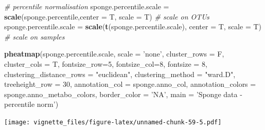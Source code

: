 \documentclass[]{book}
\newenvironment{Shaded}{\begin{snugshade}}{\end{snugshade}}
\newcommand{\KeywordTok}[1]{\textcolor[rgb]{0.13,0.29,0.53}{\textbf{#1}}}
\newcommand{\DataTypeTok}[1]{\textcolor[rgb]{0.13,0.29,0.53}{#1}}
\newcommand{\DecValTok}[1]{\textcolor[rgb]{0.00,0.00,0.81}{#1}}
\newcommand{\StringTok}[1]{\textcolor[rgb]{0.31,0.60,0.02}{#1}}
\newcommand{\CommentTok}[1]{\textcolor[rgb]{0.56,0.35,0.01}{\textit{#1}}}
\newcommand{\NormalTok}[1]{#1}
\begin{document}
\begin{Shaded}
\begin{Highlighting}[]
\CommentTok{# percentile normalisation}
\NormalTok{sponge.percentile.scale =}\StringTok{ }\KeywordTok{scale}\NormalTok{(sponge.percentile,}\DataTypeTok{center =}\NormalTok{ T, }\DataTypeTok{scale =}\NormalTok{ T) }\CommentTok{# scale on OTUs}
\NormalTok{sponge.percentile.scale =}\StringTok{ }\KeywordTok{scale}\NormalTok{(}\KeywordTok{t}\NormalTok{(sponge.percentile.scale), }\DataTypeTok{center =}\NormalTok{ T, }\DataTypeTok{scale =}\NormalTok{ T) }\CommentTok{# scale on samples}

\KeywordTok{pheatmap}\NormalTok{(sponge.percentile.scale, }
         \DataTypeTok{scale =} \StringTok{'none'}\NormalTok{, }
         \DataTypeTok{cluster_rows =}\NormalTok{ F, }
         \DataTypeTok{cluster_cols =}\NormalTok{ T, }
         \DataTypeTok{fontsize_row=}\DecValTok{5}\NormalTok{, }\DataTypeTok{fontsize_col=}\DecValTok{8}\NormalTok{,}
         \DataTypeTok{fontsize =} \DecValTok{8}\NormalTok{,}
         \DataTypeTok{clustering_distance_rows =} \StringTok{"euclidean"}\NormalTok{,}
         \DataTypeTok{clustering_method =} \StringTok{"ward.D"}\NormalTok{,}
         \DataTypeTok{treeheight_row =} \DecValTok{30}\NormalTok{,}
         \DataTypeTok{annotation_col =}\NormalTok{ sponge.anno_col,}
         \DataTypeTok{annotation_colors =}\NormalTok{ sponge.anno_metabo_colors,}
         \DataTypeTok{border_color =} \StringTok{'NA'}\NormalTok{,}
         \DataTypeTok{main =} \StringTok{'Sponge data - percentile norm'}\NormalTok{)}
\end{Highlighting}
\end{Shaded}

\texttt{[image: vignette\_files/figure-latex/unnamed-chunk-59-5.pdf]}
\end{document}
